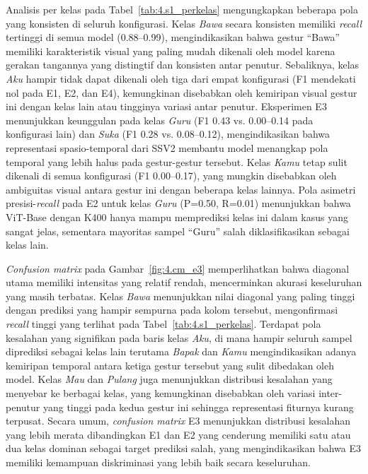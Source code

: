Analisis per kelas pada Tabel~\ref{tab:4.s1_perkelas} mengungkapkan beberapa pola yang konsisten di seluruh konfigurasi. Kelas \textit{Bawa} secara konsisten memiliki \textit{recall} tertinggi di semua model (0.88--0.99), mengindikasikan bahwa gestur ``Bawa'' memiliki karakteristik visual yang paling mudah dikenali oleh model karena gerakan tangannya yang distingtif dan konsisten antar penutur. Sebaliknya, kelas \textit{Aku} hampir tidak dapat dikenali oleh tiga dari empat konfigurasi (F1 mendekati nol pada E1, E2, dan E4), kemungkinan disebabkan oleh kemiripan visual gestur ini dengan kelas lain atau tingginya variasi antar penutur. Eksperimen E3 menunjukkan keunggulan pada kelas \textit{Guru} (F1 0.43 vs. 0.00--0.14 pada konfigurasi lain) dan \textit{Suka} (F1 0.28 vs. 0.08--0.12), mengindikasikan bahwa representasi spasio-temporal dari SSV2 membantu model menangkap pola temporal yang lebih halus pada gestur-gestur tersebut. Kelas \textit{Kamu} tetap sulit dikenali di semua konfigurasi (F1 0.00--0.17), yang mungkin disebabkan oleh ambiguitas visual antara gestur ini dengan beberapa kelas lainnya. Pola asimetri presisi-\textit{recall} pada E2 untuk kelas \textit{Guru} (P=0.50, R=0.01) menunjukkan bahwa ViT-Base dengan K400 hanya mampu memprediksi kelas ini dalam kasus yang sangat jelas, sementara mayoritas sampel ``Guru'' salah diklasifikasikan sebagai kelas lain.\par
\par

\textit{Confusion matrix} pada Gambar~\ref{fig:4.cm_e3} memperlihatkan bahwa diagonal utama memiliki intensitas yang relatif rendah, mencerminkan akurasi keseluruhan yang masih terbatas. Kelas \textit{Bawa} menunjukkan nilai diagonal yang paling tinggi dengan prediksi yang hampir sempurna pada kolom tersebut, mengonfirmasi \textit{recall} tinggi yang terlihat pada Tabel~\ref{tab:4.s1_perkelas}. Terdapat pola kesalahan yang signifikan pada baris kelas \textit{Aku}, di mana hampir seluruh sampel diprediksi sebagai kelas lain terutama \textit{Bapak} dan \textit{Kamu} mengindikasikan adanya kemiripan temporal antara ketiga gestur tersebut yang sulit dibedakan oleh model. Kelas \textit{Mau} dan \textit{Pulang} juga menunjukkan distribusi kesalahan yang menyebar ke berbagai kelas, yang kemungkinan disebabkan oleh variasi inter-penutur yang tinggi pada kedua gestur ini sehingga representasi fiturnya kurang terpusat. Secara umum, \textit{confusion matrix} E3 menunjukkan distribusi kesalahan yang lebih merata dibandingkan E1 dan E2 yang cenderung memiliki satu atau dua kelas dominan sebagai target prediksi salah, yang mengindikasikan bahwa E3 memiliki kemampuan diskriminasi yang lebih baik secara keseluruhan.\par
\par


